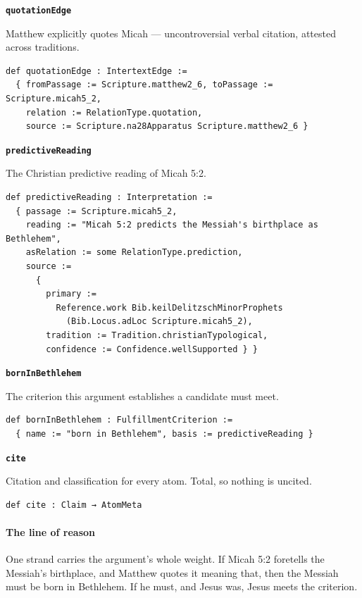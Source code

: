 \documentclass[11pt]{article}
\begin{document}
\par\medskip\noindent\textbf{\texttt{quotation\allowbreak{}Edge}}\par\nobreak\noindent
Matthew explicitly quotes Micah — uncontroversial verbal citation, attested across traditions.

{\small\begin{verbatim}
def quotationEdge : IntertextEdge :=
  { fromPassage := Scripture.matthew2_6, toPassage := Scripture.micah5_2,
    relation := RelationType.quotation,
    source := Scripture.na28Apparatus Scripture.matthew2_6 }
\end{verbatim}}
\par\medskip\noindent\textbf{\texttt{predictive\allowbreak{}Reading}}\par\nobreak\noindent
The Christian predictive reading of Micah 5:2.

{\small\begin{verbatim}
def predictiveReading : Interpretation :=
  { passage := Scripture.micah5_2,
    reading := "Micah 5:2 predicts the Messiah's birthplace as Bethlehem",
    asRelation := some RelationType.prediction,
    source :=
      {
        primary :=
          Reference.work Bib.keilDelitzschMinorProphets
            (Bib.Locus.adLoc Scripture.micah5_2),
        tradition := Tradition.christianTypological,
        confidence := Confidence.wellSupported } }
\end{verbatim}}
\par\medskip\noindent\textbf{\texttt{born\allowbreak{}In\allowbreak{}Bethlehem}}\par\nobreak\noindent
The criterion this argument establishes a candidate must meet.

{\small\begin{verbatim}
def bornInBethlehem : FulfillmentCriterion :=
  { name := "born in Bethlehem", basis := predictiveReading }
\end{verbatim}}
\par\medskip\noindent\textbf{\texttt{cite}}\par\nobreak\noindent
Citation and classification for every atom. Total, so nothing is uncited.

{\small\begin{verbatim}
def cite : Claim → AtomMeta
\end{verbatim}}
\paragraph*{The line of reason}
\leavevmode\par\nobreak
One strand carries the argument’s whole weight. If Micah 5:2 foretells the Messiah’s birthplace, and Matthew quotes it meaning that, then the Messiah must be born in Bethlehem. If he must, and Jesus was, Jesus meets the criterion.
\end{document}
